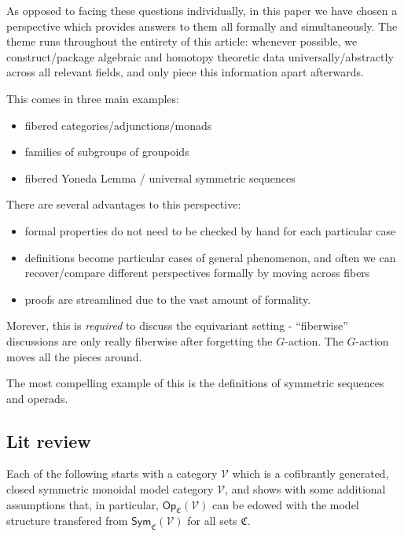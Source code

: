 \documentclass[a4paper,10pt
,draft
]{article}%
\numberwithin{equation}{section}
\numberwithin{figure}{section}
\theoremstyle{definition} %
\newcommand{\Sym}{\ensuremath{\mathsf{Sym}}}%
\newcommand{\Op}{\mathsf{Op}}%
\newcommand{\V}{\ensuremath{\mathcal V}}
\newcommand{\1}{\ensuremath{\mathbbm 1}}%
\begin{document}
As opposed to facing these questions individually,
in this paper we have chosen a perspective which provides answers to them all formally and simultaneously.
The theme runs throughout the entirety of this article:
whenever possible, we construct/package algebraic and homotopy theoretic data universally/abstractly across all relevant fields, and only piece this information apart afterwards.

This comes in three main examples:
\begin{itemize}
\item fibered categories/adjunctions/monads
\item families of subgroups of groupoids
\item fibered Yoneda Lemma / universal symmetric sequences
\end{itemize}

There are several advantages to this perspective:
\begin{itemize}
\item formal properties do not need to be checked by hand for each particular case
\item definitions become particular cases of general phenomenon, and often we can recover/compare different perspectives formally by moving across fibers
\item proofs are streamlined due to the vast amount of formality.
\end{itemize}

Morever, this is \textit{required} to discuss the equivariant setting - ``fiberwise'' discussions are only really fiberwise after forgetting the $G$-action. The $G$-action moves all the pieces around.

The most compelling example of this is the definitions of symmetric sequences and operads.


\subsection{Lit review}

Each of the following starts with a category $\V$ which is a cofibrantly generated, closed symmetric monoidal model category $\V$,
and shows with some additional assumptions that, in particular, $\Op_{\mathfrak C}(\V)$ can be edowed with the model structure transfered from $\Sym_{\mathfrak C}(\V)$ for all sets $\mathfrak C$.
\end{document}
